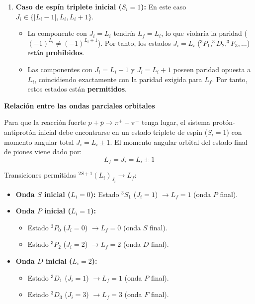 \begin{problema}
\begin{enumerate}[label=\arabic*.]
    \item \textbf{Caso de espín triplete inicial ($S_i = 1$):}
    En este caso $J_i \in \{|L_i - 1|, L_i, L_i + 1\}$.
    \begin{itemize}
        \item La componente con $J_i = L_i$ tendría $L_f = L_i$, lo que violaría la paridad ($(-1)^{L_i} \neq (-1)^{L_i + 1}$). Por tanto, los estados $J_i = L_i$ ($^3P_1, ^3D_2, ^3F_3, \dots$) están \textbf{prohibidos}.
        \item Las componentes con $J_i = L_i - 1$ y $J_i = L_i + 1$ poseen paridad opuesta a $L_i$, coincidiendo exactamente con la paridad exigida para $L_f$. Por tanto, estos estados están \textbf{permitidos}.
    \end{itemize}
\end{enumerate}

\textbf{Relación entre las ondas parciales orbitales}

Para que la reacción fuerte $p + \bar{p} \to \pi^+ + \pi^-$ tenga lugar, el sistema protón-antiprotón inicial debe encontrarse en un estado triplete de espín ($S_i = 1$) con momento angular total $J_i = L_i \pm 1$. El momento angular orbital del estado final de piones viene dado por:
\begin{equation*}
    L_f = J_i = L_i \pm 1
\end{equation*}

Transiciones permitidas $^{2S+1}(L_i)_{J_i} \longrightarrow L_f$:
\begin{itemize}
    \item \textbf{Onda $S$ inicial ($L_i = 0$):} Estado $^3S_1$ ($J_i = 1$) $\longrightarrow L_f = 1$ (onda $P$ final).
    \item \textbf{Onda $P$ inicial ($L_i = 1$):}
    \begin{itemize}
        \item Estado $^3P_0$ ($J_i = 0$) $\longrightarrow L_f = 0$ (onda $S$ final).
        \item Estado $^3P_2$ ($J_i = 2$) $\longrightarrow L_f = 2$ (onda $D$ final).
    \end{itemize}
    \item \textbf{Onda $D$ inicial ($L_i = 2$):}
    \begin{itemize}
        \item Estado $^3D_1$ ($J_i = 1$) $\longrightarrow L_f = 1$ (onda $P$ final).
        \item Estado $^3D_3$ ($J_i = 3$) $\longrightarrow L_f = 3$ (onda $F$ final).
    \end{itemize}
\end{itemize}


\end{problema}
